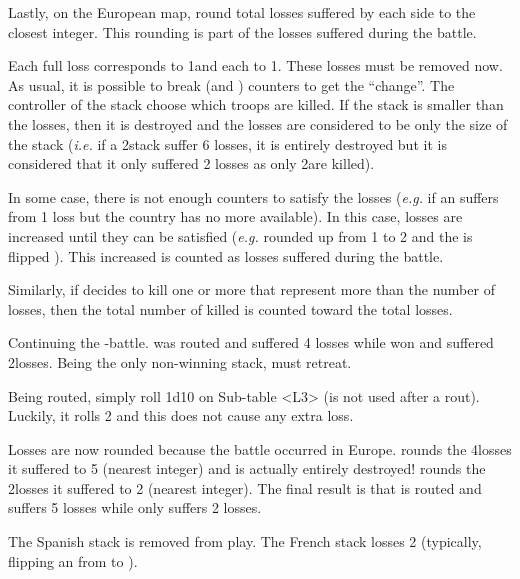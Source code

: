 Lastly, on the European map, round total losses suffered by each side to the
closest integer. This rounding is part of the losses suffered during the
battle.

Each full loss corresponds to 1\LD and each \texttu to 1\LDE. These losses
must be removed now. As usual, it is possible to break \ARMY (and \LD)
counters to get the ``change''. The controller of the stack choose which
troops are killed. If the stack is smaller than the losses, then it is
destroyed and the losses are considered to be only the size of the stack
(\emph{i.e.} if a 2\LD stack suffer 6 losses, it is entirely destroyed but it
is considered that it only suffered 2 losses as only 2\LD are killed).

In some case, there is not enough counters to satisfy the losses (\emph{e.g.}
if an \ARMY\faceplus suffers from 1 loss but the country has no more \LD
available). In this case, losses are increased until they can be satisfied
(\emph{e.g.} rounded up from 1 to 2 and the \ARMY\faceplus is flipped
\Facemoins). This increased is counted as losses suffered during the battle.

Similarly, if \TUR decides to kill one or more \Pashas that represent more \LD
than the number of losses, then the total number of \LD killed is counted
toward the total losses.

\begin{exemple}
  Continuing the \FRA-\HIS battle. \HIS was routed and suffered 4\texttd
  losses while \FRA won and suffered 2\texttu losses. Being the only
  non-winning stack, \HIS must retreat.

  Being routed, \HIS simply roll 1d10 on Sub-table <L3> (\Man is not used
  after a rout). Luckily, it rolls 2 and this does not cause any extra loss.

  Losses are now rounded because the battle occurred in Europe. \HIS rounds
  the 4\texttd losses it suffered to 5 (nearest integer) and is actually
  entirely destroyed!  \FRA rounds the 2\texttu losses it suffered to 2
  (nearest integer). The final result is that \HIS is routed and suffers 5
  losses while \FRA only suffers 2 losses.

  The Spanish stack is removed from play. The French stack losses 2\LD
  (typically, flipping an \ARMY from \Faceplus to \Facemoins).
\end{exemple}

